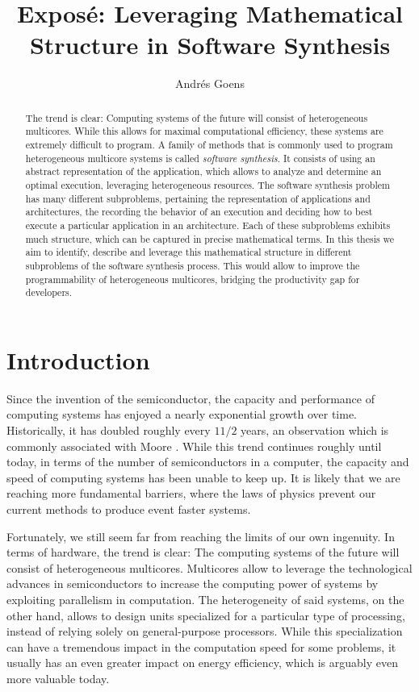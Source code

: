 \documentclass[sigplan,10pt]{acmart}
\title{Expos\'{e}: Leveraging Mathematical Structure in Software Synthesis}
\author{Andr\'{e}s Goens}
\begin{document}
\date{}
\begin{abstract}
The trend is clear: Computing systems of the future will consist of heterogeneous multicores. While this allows for maximal computational efficiency, these systems are extremely difficult to program.
A family of methods that is commonly used to program heterogeneous multicore systems is called \emph{software synthesis}.
It consists of using an abstract representation of the application, which allows to analyze and determine an optimal execution, leveraging heterogeneous resources.
The software synthesis problem has many different subproblems, pertaining the representation of applications and architectures, the recording the behavior of an execution and deciding how to best execute a particular application in an architecture.
Each of these subproblems exhibits much structure, which can be captured in precise mathematical terms. In this thesis we aim to identify, describe and leverage this mathematical structure in different subproblems of the software synthesis process.
This would allow to improve the programmability of heterogeneous multicores, bridging the productivity gap for developers.

\end{abstract}

\maketitle

\section*{Introduction}
Since the invention of the semiconductor, the capacity and performance of computing systems has enjoyed a nearly exponential growth over time. Historically, it has doubled roughly every $1 1/2$ years, an observation which is commonly associated with Moore \cite{schaller1997moore}.
While this trend continues roughly until today, in terms of the number of semiconductors in a computer, the capacity and speed of computing systems has been unable to keep up. It is likely that we are reaching more fundamental barriers, where the laws of physics prevent our
current methods to produce event faster systems. 

Fortunately, we still seem far from reaching the limits of our own ingenuity. In terms of hardware, the trend is clear: The computing systems of the future will consist of heterogeneous multicores. Multicores allow to leverage the technological advances in semiconductors to 
increase the computing power of systems by exploiting parallelism in computation. The heterogeneity of said systems, on the other hand, allows to design units specialized for a particular type of processing, instead of relying solely on general-purpose processors.
While this specialization can have a tremendous impact in the computation speed for some problems, it usually has an even greater impact on energy efficiency, which is arguably even more valuable today.
\end{document}
